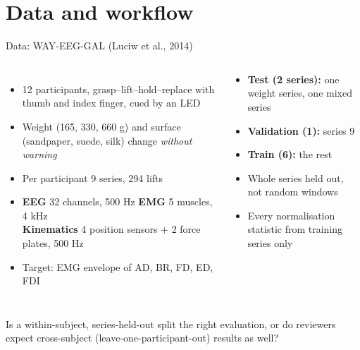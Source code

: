\documentclass[aspectratio=169,10pt]{beamer}
\newcommand{\Verify}[1]{\begin{tcolorbox}[askbox,title={Check with the supervisor}]#1\end{tcolorbox}}
\begin{document}
\section{Data and workflow}

\begin{frame}{Data: WAY-EEG-GAL (Luciw et al., 2014)}
  \begin{columns}[T]
    \begin{itemize}\small
      \item 12 participants, grasp--lift--hold--replace with thumb and index finger, cued by an LED
      \item Weight (165, 330, 660 g) and surface (sandpaper, suede, silk) change \emph{without warning}
      \item Per participant 9 series, 294 lifts
      \item \textbf{EEG} 32 channels, 500 Hz \quad \textbf{EMG} 5 muscles, 4 kHz\\
            \textbf{Kinematics} 4 position sensors + 2 force plates, 500 Hz
      \item Target: EMG envelope of AD, BR, FD, ED, FDI
    \end{itemize}
    \begin{tcolorbox}[stagebox,title={Split, fixed for every model}]
      \begin{itemize}\scriptsize
        \item \textbf{Test (2 series):} one weight series, one mixed series
        \item \textbf{Validation (1):} series 9
        \item \textbf{Train (6):} the rest
        \item Whole series held out, not random windows
        \item Every normalisation statistic from training series only
      \end{itemize}
    \end{tcolorbox}
  \end{columns}
  \Verify{\scriptsize Is a within-subject, series-held-out split the right evaluation, or do reviewers expect cross-subject (leave-one-participant-out) results as well?}
\end{frame}
\end{document}
